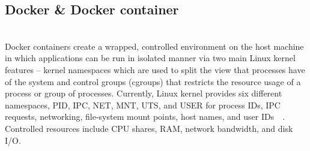 
 
 
 
\subsection{Docker \& Docker container}

 
\\
Docker containers create a wrapped, controlled environment on the host machine in which applications can be run in isolated manner via two main Linux kernel features -- kernel namespaces which are used to split the view that processes have of the system and control groups (cgroups) that restricts the resource usage of a process or group of processes. Currently, Linux kernel provides six different namespaces, PID, IPC, NET, MNT, UTS, and USER for process IDs, IPC requests, networking, file-system mount points, host names, and user IDs~\cite{xxx}~\cite{xxx}. Controlled resources include CPU shares, RAM, network bandwidth, and disk I/O.

